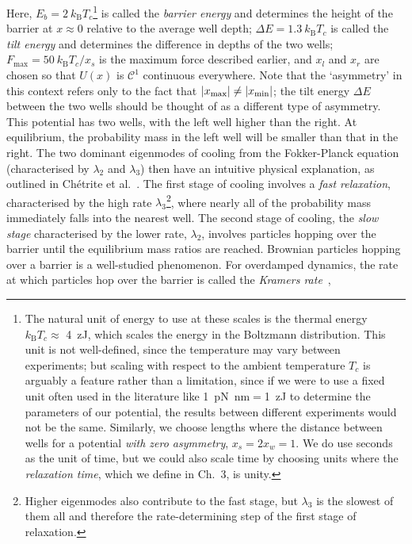 \documentclass[hyperref={colorlinks=true, urlcolor=blue, citecolor=blue, final, bound}]{sfuthesis}
\newcommand{\kB}{k_{\mathrm{B}}}
\begin{document}
Here, $E_b=2~\kB T_c$\footnote{The natural unit of energy to use at these scales is the thermal energy $\kB T_c \approx$ \qty{4}{\zepto\joule}, which scales the energy in the Boltzmann distribution. This unit is not well-defined, since the temperature may vary between experiments; but scaling with respect to the ambient temperature $T_c$ is arguably a feature rather than a limitation, since if we were to use a fixed unit often used in the literature like \qty{1}{\pico\newton\nano\metre}$=$\qty{1}{\zepto\joule} to determine the parameters of our potential, the results between different experiments would not be the same. Similarly, we choose lengths where the distance between wells for a potential \textit{with zero asymmetry}, $x_s=2x_w=1$. We do use seconds as the unit of time, but we could also scale time by choosing units where the \textit{relaxation time}, which we define in Ch.~3, is unity.} is called the \textit{barrier energy} and determines the height of the barrier at $x\approx 0$ relative to the average well depth; $\Delta E=1.3~\kB T_c$ is called the \textit{tilt energy} and determines the difference in depths of the two wells; $F_{\max} = 50~\kB T_c/x_s$ is the maximum force described earlier, and $x_l$ and $x_r$ are chosen so that $U(x)$ is $\mathcal C^1$ continuous everywhere. Note that the `asymmetry' in this context refers only to the fact that $\abs{x_{\max}}\neq \abs{x_{\min}}$; the tilt energy $\Delta E$ between the two wells should be thought of as a different type of asymmetry.
This potential has two wells, with the left well higher than the right. At equilibrium, the probability mass in the left well will be smaller than that in the right. The two dominant eigenmodes of cooling from the Fokker-Planck equation (characterised by $\lambda_2$ and $\lambda_3$) then have an intuitive physical explanation, as outlined in Ch\'etrite et al.~\cite{Chetrite2021}. The first stage of cooling involves a \textit{fast relaxation}, characterised by the high rate $\lambda_3$\footnote{Higher eigenmodes also contribute to the fast stage, but $\lambda_3$ is the slowest of them all and therefore the rate-determining step of the first stage of relaxation.}, where nearly all of the probability mass immediately falls into the nearest well. The second stage of cooling, the \textit{slow stage} characterised by the lower rate, $\lambda_2$, involves particles hopping over the barrier until the equilibrium mass ratios are reached. Brownian particles hopping over a barrier is a well-studied phenomenon. For overdamped dynamics, the rate at which particles hop over the barrier is called the \textit{Kramers rate}~\cite{Risken1996}, 
\end{document}
